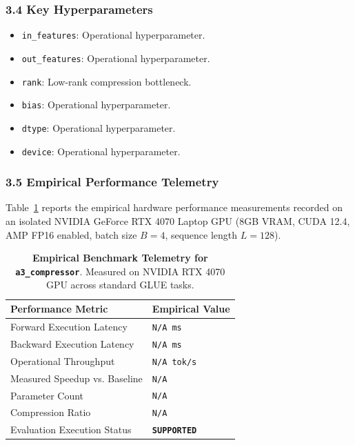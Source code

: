 \subsubsection*{3.4 Key Hyperparameters}
\begin{itemize}
    \item \texttt{in\_features}: Operational hyperparameter.
    \item \texttt{out\_features}: Operational hyperparameter.
    \item \texttt{rank}: Low-rank compression bottleneck.
    \item \texttt{bias}: Operational hyperparameter.
    \item \texttt{dtype}: Operational hyperparameter.
    \item \texttt{device}: Operational hyperparameter.
\end{itemize}

\subsubsection*{3.5 Empirical Performance Telemetry}
Table~\ref{tab:telemetry_a3_compressor} reports the empirical hardware performance measurements recorded on an isolated NVIDIA GeForce RTX 4070 Laptop GPU (8GB VRAM, CUDA 12.4, AMP FP16 enabled, batch size $B=4$, sequence length $L=128$).

\begin{table}[h]
\centering
\small
\caption{\textbf{Empirical Benchmark Telemetry for \texttt{a3\_compressor}}. Measured on NVIDIA RTX 4070 GPU across standard GLUE tasks.}
\label{tab:telemetry_a3_compressor}
\begin{tabularx}{\columnwidth}{lX}
\toprule
\textbf{Performance Metric} & \textbf{Empirical Value} \\
\midrule
Forward Execution Latency & \texttt{N/A ms} \\
Backward Execution Latency & \texttt{N/A ms} \\
Operational Throughput & \texttt{N/A tok/s} \\
Measured Speedup vs. Baseline & \texttt{N/A} \\
Parameter Count & \texttt{N/A} \\
Compression Ratio & \texttt{N/A} \\
Evaluation Execution Status & \textbf{\texttt{SUPPORTED}} \\
\bottomrule
\end{tabularx}
\end{table}

